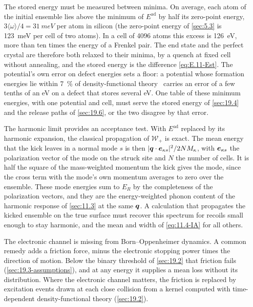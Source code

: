 The stored energy must be measured between minima. On average, each atom of the initial ensemble lies above the minimum of $E^{\mathrm{ad}}$ by half its zero-point energy, $3\langle\omega\rangle/4 = \SI{31}{meV}$ per atom in silicon (the zero-point energy of \cref{sec:5.3} is \SI{123}{meV} per cell of two atoms). In a cell of 4096 atoms this excess is \SI{126}{eV}, more than ten times the energy of a Frenkel pair. The end state and the perfect crystal are therefore both relaxed to their minima, by a quench at fixed cell without annealing, and the stored energy is the difference \cref{eq:E.11-Est}. The potential's own error on defect energies sets a floor: a potential whose formation energies lie within \SI{7}{\percent} of density-functional theory~\cite[Sect.~III\,E]{bartok2018machine} carries an error of a few tenths of an eV on a defect that stores several eV. One table of these minimum energies, with one potential and cell, must serve the stored energy of \cref{sec:19.4} and the release paths of \cref{sec:19.6}, or the two disagree by that error.

The harmonic limit provides an acceptance test. With $E^{\mathrm{ad}}$ replaced by its harmonic expansion, the classical propagation of $\mathcal{W}_+$ is exact. The mean energy that the kick leaves in a normal mode $s$ is then $|\bm{q}\cdot\bm{e}_{\kappa s}|^2/2NM_\kappa$, with $\bm{e}_{\kappa s}$ the polarization vector of the mode on the struck site and $N$ the number of cells. It is half the square of the mass-weighted momentum the kick gives the mode, since the cross term with the mode's own momentum averages to zero over the ensemble. These mode energies sum to $E_R$ by the completeness of the polarization vectors, and they are the energy-weighted phonon content of the harmonic response of \cref{sec:11.3} at the same $\bm{q}$. A calculation that propagates the kicked ensemble on the true surface must recover this spectrum for recoils small enough to stay harmonic, and the mean and width of \cref{eq:11.4-IA} for all others.

The electronic channel is missing from Born--Oppenheimer dynamics. A common remedy adds a friction force, minus the electronic stopping power times the direction of motion. Below the binary threshold of \cref{sec:19.2} that friction fails (\cref{sec:19.3-assumptions}), and at any energy it supplies a mean loss without its distribution. Where the electronic channel matters, the friction is replaced by excitation events drawn at each close collision from a kernel computed with time-dependent density-functional theory (\cref{sec:19.2}).

